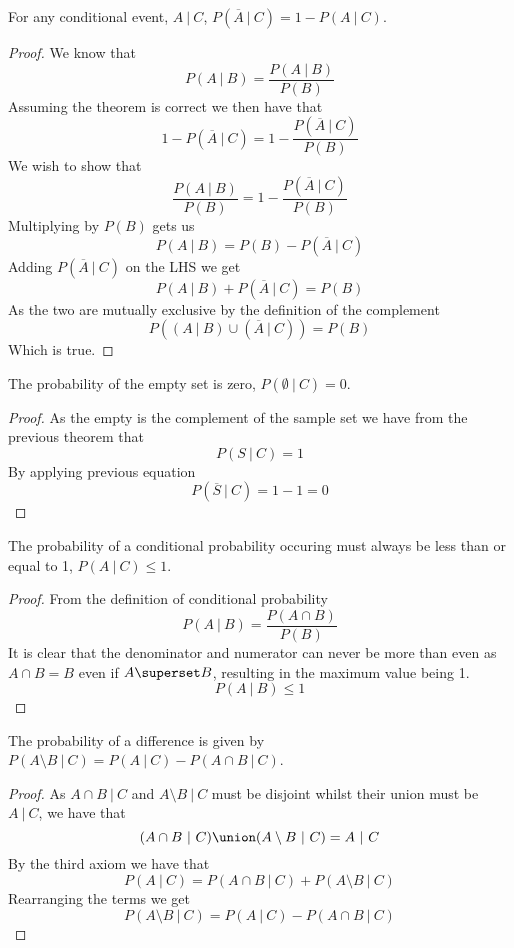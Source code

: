 \begin{theorem}
  For any conditional event, $A~|~C$, $P(\overline{A}~|~C)=1-P(A~|~C)$.
\end{theorem}
\begin{proof}
  We know that
  \[
      P(A~|~B)=\frac{P(A~|~B)}{P(B)}
  \]
  Assuming the theorem is correct we then have that
  \[
      1-P(\overline{A}~|~C)=1-\frac{P(\overline{A}~|~C)}{P(B)}
  \]
  We wish to show that
  \[
      \frac{P(A~|~B)}{P(B)}=1-\frac{P(\overline{A}~|~C)}{P(B)}
  \]
  Multiplying by $P(B)$ gets us
  \[
      P(A~|~B)=P(B)-P(\overline{A}~|~C)
  \]
  Adding $P(\overline{A}~|~C)$ on the LHS we get
  \[
      P(A~|~B)+P(\overline{A}~|~C)=P(B)
  \]
  As the two are mutually exclusive by the definition of the complement
  \[
      P((A~|~B)\cup (\overline{A}~|~C))=P(B)
  \]
  Which is true.
\end{proof}
\begin{theorem}
  The probability of the empty set is zero, $P(\emptyset~|~C)=0$.
\end{theorem}
\begin{proof}
  As the empty is the complement of the sample set we have from the previous theorem that
  \[
      P(S~|~C)=1
  \]
  By applying previous equation
  \[
      P(\overline{S}~|~C)=1-1=0
  \]
\end{proof}
\begin{theorem}
  The probability of a conditional probability occuring must always be less than or equal to 1, $P(A~|~C)\leq 1$.
\end{theorem}
\begin{proof}
  From the definition of conditional probability
  \[
      P(A~|~B)=\frac{P(A\cap B)}{P(B)}
  \]
  It is clear that the denominator and numerator can never be more than even as $A\cap B=B$ even if $A\superset B$, resulting in the maximum value being 1.
  \[
      P(A~|~B)\leq 1
  \]
\end{proof}
\begin{theorem}
  The probability of a difference is given by $P(A\setminus B~|~C)=P(A~|~C)-P(A\cap B~|~C)$.
\end{theorem}
\begin{proof}
  As $A\cap B~|~C$ and $A\setminus B~|~C$ must be disjoint whilst their union must be $A~|~C$, we have that
  \[
      (A\cap B~|~C)\union (A\setminus B~|~C)=A~|~C
  \]
  By the third axiom we have that
  \[
      P(A~|~C)=P(A\cap B~|~C)+P(A\setminus B~|~C)
  \]
  Rearranging the terms we get
  \[
      P(A\setminus B~|~C)=P(A~|~C)-P(A\cap B~|~C)
  \]
\end{proof}
